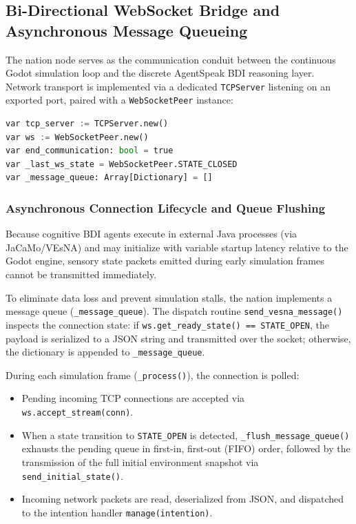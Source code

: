 \subsection{Bi-Directional WebSocket Bridge and Asynchronous Message Queueing}
\label{subsec:websocket_bridge}

The nation node serves as the communication conduit between the continuous Godot simulation loop and the discrete AgentSpeak BDI reasoning layer. Network transport is implemented via a dedicated \texttt{TCPServer} listening on an exported port, paired with a \texttt{WebSocketPeer} instance:

\begin{lstlisting}[language=python, caption={WebSocket network infrastructure declarations in Agent.gd.}, label={lst:network_vars}]
var tcp_server := TCPServer.new()
var ws := WebSocketPeer.new()
var end_communication: bool = true
var _last_ws_state = WebSocketPeer.STATE_CLOSED
var _message_queue: Array[Dictionary] = []
\end{lstlisting}

\subsubsection{Asynchronous Connection Lifecycle and Queue Flushing}
Because cognitive BDI agents execute in external Java processes (via JaCaMo/VEsNA) and may initialize with variable startup latency relative to the Godot engine, sensory state packets emitted during early simulation frames cannot be transmitted immediately. 

To eliminate data loss and prevent simulation stalls, the nation implements a message queue (\texttt{\_message\_queue}). The dispatch routine \texttt{send\_vesna\_message()} inspects the connection state: if \texttt{ws.get\_ready\_state() == STATE\_OPEN}, the payload is serialized to a JSON string and transmitted over the socket; otherwise, the dictionary is appended to \texttt{\_message\_queue}.

During each simulation frame (\texttt{\_process()}), the connection is polled:
\begin{itemize}
    \item Pending incoming TCP connections are accepted via \texttt{ws.accept\_stream(conn)}.
    \item When a state transition to \texttt{STATE\_OPEN} is detected, \texttt{\_flush\_message\_queue()} exhausts the pending queue in first-in, first-out (FIFO) order, followed by the transmission of the full initial environment snapshot via \texttt{send\_initial\_state()}.
    \item Incoming network packets are read, deserialized from JSON, and dispatched to the intention handler \texttt{manage(intention)}.
\end{itemize}

